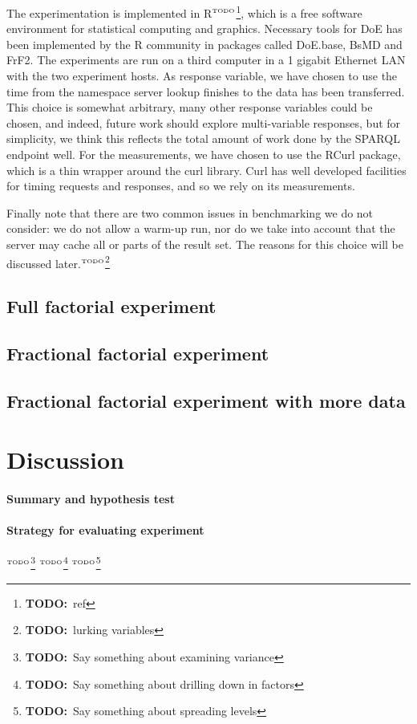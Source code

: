 \documentclass{article}
\newcommand{\todo}[1]{\ensuremath{^{\textrm{\tiny{TODO}\normalsize}}}\footnote{\textbf{TODO:}~#1}}
\begin{document}
The experimentation is implemented in R\todo{ref}, which is a free
software environment for statistical computing and graphics. Necessary
tools for DoE has been implemented by the R community in packages
called DoE.base, BsMD and FrF2. The experiments are run on a third
computer in a 1 gigabit Ethernet LAN with the two experiment hosts.  As
response variable, we have chosen to use the time from the namespace
server lookup finishes to the data has been transferred. This choice is
somewhat arbitrary, many other response variables could be chosen, and
indeed, future work should explore multi-variable responses, but for
simplicity, we think this reflects the total amount of work done by
the SPARQL endpoint well. For the measurements, we have chosen to use
the RCurl package, which is a thin wrapper around the curl
library. Curl has well developed facilities for timing requests and
responses, and so we rely on its measurements.

Finally note that there are two common issues in benchmarking we do
not consider: we do not allow a warm-up run, nor do we take into
account that the server may cache all or parts of the result set. The
reasons for this choice will be discussed later.\todo{lurking
  variables}

\subsection{Full factorial experiment}

\subsection{Fractional factorial experiment}

\subsection{Fractional factorial experiment with more data}


\section{Discussion}

\paragraph{Summary and hypothesis test}

\paragraph{Strategy for evaluating experiment}\todo{Say something
  about examining variance} \todo{Say something about drilling down in
  factors} \todo{Say something about spreading levels}
\end{document}
